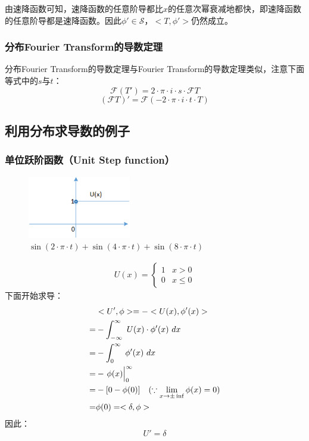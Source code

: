 由速降函数可知，速降函数的任意阶导都比$x$的任意次幂衰减地都快，即速降函数的任意阶导都是速降函数。因此$\phi'\in \mathcal  {S}$，$<T,\phi'>$仍然成立。
\subsubsection{分布Fourier Transform的导数定理}
分布Fourier Transform的导数定理与Fourier Transform的导数定理类似，注意下面等式中的$s$与$t$：
\begin{equation}
	\mathcal{F}(T')=2\cdot\pi\cdot i\cdot s\cdot \mathcal{F}T
\end{equation}
\begin{equation}
	(\mathcal{F}T)'=\mathcal{F}(-2\cdot\pi\cdot i\cdot t\cdot T)
\end{equation}

\subsection{利用分布求导数的例子}
\subsubsection {单位跃阶函数（Unit Step function）}
\begin{figure}[H]
	\centering
	\includegraphics[width=0.4\textwidth]{assets/U_function.png}
	\caption{$\sin(2\cdot\pi\cdot t)+\sin(4\cdot\pi\cdot t)+\sin(8\cdot\pi\cdot t)$}
\end{figure}
\begin{align*}
	U(x)=
	\begin{cases}
		1 & x>0    \\
		0 & x\leq0
	\end{cases}
\end{align*}
下面开始求导：
\begin{align*}
	  & <U',\phi>=-<U(x),\phi'(x)>                                                  \\
	= & -\int_{-\infty}^{\infty}\ U(x)\cdot \phi'(x)\ dx                            \\
	= & -\int_{0}^{\infty}\ \phi'(x)\ dx                                            \\
	= & -\rsx{\phi(x)}_0^\infty                                                     \\
	= & -[0-\phi(0)]   \quad  (\because \lim\limits_{x\rightarrow\pm\inf}\phi(x)=0) \\
	= & \phi(0) = <\delta,\phi>
\end{align*}
因此：
\begin{equation}
	U'=\delta
\end{equation}

